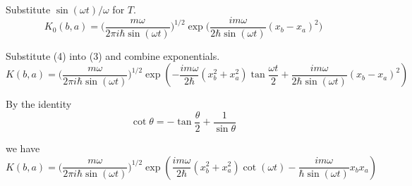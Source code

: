 \documentclass[12pt]{article}
\begin{document}
Substitute $\sin(\omega t)/\omega$ for $T$.
\begin{equation*}
K_0(b,a)=\biggl(\frac{m\omega}{2\pi i\hbar\sin(\omega t)}\biggr)^{1/2}
\exp\biggl(\frac{im\omega}{2\hbar\sin(\omega t)}(x_b-x_a)^2\biggr)
\tag{4}
\end{equation*}

Substitute (4) into (3) and combine exponentials.
$$
K(b,a)=\biggl(\frac{m\omega}{2\pi i\hbar\sin(\omega t)}\biggr)^{1/2}
\exp\left(-\frac{im\omega}{2\hbar}\left(x_b^2+x_a^2\right)\tan\frac{\omega t}{2}
+\frac{im\omega}{2\hbar\sin(\omega t)}(x_b-x_a)^2\right)
$$

By the identity
$$
\cot\theta=-\tan\frac{\theta}{2}+\frac{1}{\sin\theta}
$$

we have
$$
K(b,a)=\biggl(\frac{m\omega}{2\pi i\hbar\sin(\omega t)}\biggr)^{1/2}
\exp\left(\frac{im\omega}{2\hbar}\left(x_b^2+x_a^2\right)\cot(\omega t)
-\frac{im\omega}{\hbar\sin(\omega t)}x_bx_a\right)
$$
\end{document}
